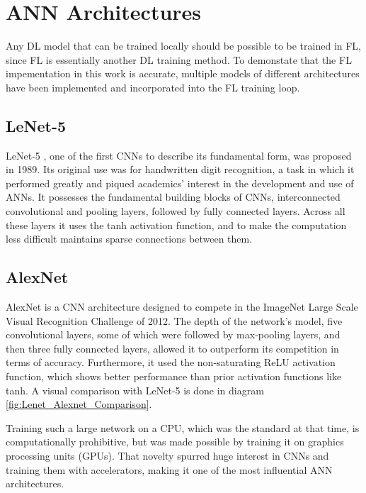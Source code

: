 \section{ANN Architectures}
Any DL model that can be trained locally should be possible to be trained in FL, since FL is essentially another DL training method. To demonstate that the FL impementation in this work is accurate, multiple models of different architectures have been implemented and incorporated into the FL training loop. 

\subsection{LeNet-5}
LeNet-5 \cite{LeNet}, one of the first CNNs to describe its fundamental form, was proposed in 1989. Its original use was for handwritten digit recognition, a task in which it performed greatly and piqued academics' interest in the development and use of ANNs. It possesses the fundamental building blocks of CNNs, interconnected convolutional and pooling layers, followed by fully connected layers. Across all these layers it uses the tanh activation function, and to make the computation less difficult maintains sparse connections between them.

\subsection{AlexNet}
AlexNet \cite{Alexnet} is a CNN architecture designed to compete in the ImageNet Large Scale Visual Recognition Challenge of 2012. The depth of the network's model, five convolutional layers, some of which were followed by max-pooling layers, and then three fully connected layers, allowed it to outperform its competition in terms of accuracy. Furthermore, it used the non-saturating ReLU activation function, which shows better performance than prior activation functions like tanh. A visual comparison with LeNet-5 is done in diagram \ref{fig:Lenet_Alexnet_Comparison}.

Training such a large network on a CPU, which was the standard at that time, is computationally prohibitive, but was made possible by training it on graphics processing units (GPUs). That novelty spurred huge interest in CNNs and training them with accelerators, making it one of the most influential ANN architectures.

